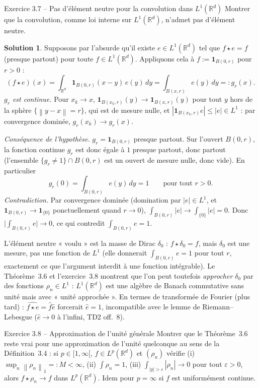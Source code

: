 \documentclass[11pt,a4paper]{article}
\newcommand{\R}{\mathbb{R}}
\newcommand{\norm}[1]{\left\|#1\right\|}
\theoremstyle{definition}
\newtheorem*{solution}{Solution}
\begin{document}
\begin{exo}{Exercice 3.7 -- Pas d'élément neutre pour la convolution dans $L^1(\R^d)$}
Montrer que la convolution, comme loi interne sur $L^1(\R^d)$, n'admet pas d'élément neutre.
\end{exo}

\begin{solution}
Supposons par l'absurde qu'il existe $e\in L^1(\R^d)$ tel que $f\star e=f$ (presque partout) pour toute $f\in L^1(\R^d)$. Appliquons cela à $f:=\mathbf 1_{B(0,r)}$ pour $r>0$ :
\[
(f\star e)(x)=\int_{\R^d}\mathbf 1_{B(0,r)}(x-y)\,e(y)\,dy=\int_{B(x,r)}e(y)\,dy=:g_r(x).
\]
\emph{$g_r$ est continue.} Pour $x_k\to x$, $\mathbf 1_{B(x_k,r)}(y)\to\mathbf 1_{B(x,r)}(y)$ pour tout $y$ hors de la sphère $\{\norm{y-x}=r\}$, qui est de mesure nulle, et $|\mathbf 1_{B(x_k,r)}e|\le|e|\in L^1$ : par convergence dominée, $g_r(x_k)\to g_r(x)$.

\emph{Conséquence de l'hypothèse.} $g_r=\mathbf 1_{B(0,r)}$ presque partout. Sur l'ouvert $B(0,r)$, la fonction continue $g_r$ est donc égale à $1$ presque partout, donc partout (l'ensemble $\{g_r\ne1\}\cap B(0,r)$ est un ouvert de mesure nulle, donc vide). En particulier
\[
g_r(0)=\int_{B(0,r)}e(y)\,dy=1\qquad\text{pour tout }r>0 .
\]
\emph{Contradiction.} Par convergence dominée (domination par $|e|\in L^1$, et $\mathbf 1_{B(0,r)}\to\mathbf 1_{\{0\}}$ ponctuellement quand $r\to0$), $\int_{B(0,r)}|e|\to\int_{\{0\}}|e|=0$. Donc $\big|\int_{B(0,r)}e\big|\to0$, ce qui contredit $\int_{B(0,r)}e=1$.
\end{solution}

\begin{commentaire}
L'élément neutre « voulu » est la masse de Dirac $\delta_0$ : $f\star\delta_0=f$, mais $\delta_0$ est une mesure, pas une fonction de $L^1$ (elle donnerait $\int_{B(0,r)}e=1$ pour tout $r$, exactement ce que l'argument interdit à une fonction intégrable). Le Théorème~3.6 et l'exercice~3.8 montrent que l'on peut toutefois \emph{approcher} $\delta_0$ par des fonctions $\rho_n\in L^1$ : $L^1(\R^d)$ est une algèbre de Banach commutative sans unité mais avec « unité approchée ». En termes de transformée de Fourier (plus tard) : $\widehat{f\star e}=\hat f\hat e$ forcerait $\hat e=1$, incompatible avec le lemme de Riemann--Lebesgue ($\hat e\to0$ à l'infini, TD2 off.~8).
\end{commentaire}

\begin{exo}{Exercice 3.8 -- Approximation de l'unité générale}
Montrer que le Théorème~3.6 reste vrai pour une approximation de l'unité quelconque au sens de la Définition~3.4 : si $p\in[1,\infty[$, $f\in L^p(\R^d)$ et $(\rho_n)$ vérifie (i) $\sup_n\norm{\rho_n}_1=:M<\infty$, (ii) $\int\rho_n=1$, (iii) $\int_{|y|>\varepsilon}|\rho_n|\to0$ pour tout $\varepsilon>0$, alors $f\star\rho_n\to f$ dans $L^p(\R^d)$. Idem pour $p=\infty$ si $f$ est uniformément continue.
\end{exo}
\end{document}
